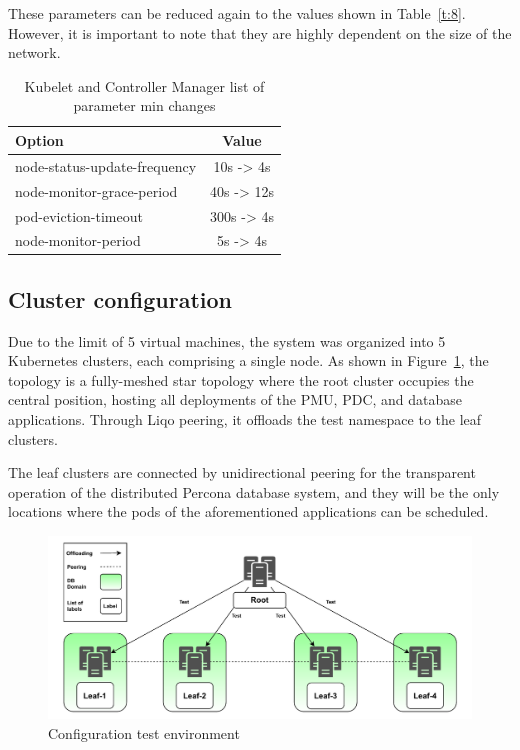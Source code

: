 These parameters can be reduced again to the values shown in Table~\ref{t:8}. However, it is important to note that they are highly dependent on the size of the network. 

\begin{table}[ht]              
\centering 
\begin{tabular}{|l|c|}
\hline 
\textbf{Option} &\textbf{Value}  \\
\hline
node-status-update-frequency & 10s -> 4s \\
\hline
node-monitor-grace-period & 40s -> 12s \\
\hline
pod-eviction-timeout &300s -> 4s \\
\hline
node-monitor-period & 5s -> 4s \\
\hline
\end{tabular}
\caption[Kubelet and Controller Manager list of parameter min changes]{Kubelet and Controller Manager list of parameter min changes} \label{t:7}  
\end{table}

\subsection{Cluster configuration}
Due to the limit of 5 virtual machines, the system was organized into 5 Kubernetes clusters, each comprising a single node. As shown in Figure~\ref{fig:test}, the topology is a fully-meshed star topology where the root cluster occupies the central position, hosting all deployments of the PMU, PDC, and database applications. Through Liqo peering, it offloads the test namespace to the leaf clusters.

The leaf clusters are connected by unidirectional peering for the transparent operation of the distributed Percona database system, and they will be the only locations where the pods of the aforementioned applications can be scheduled.

\begin{figure}[ht]\centering
\includegraphics[scale=0.6]{Pictures/test}
\caption{Configuration test environment}\label{fig:test}
\end{figure}

